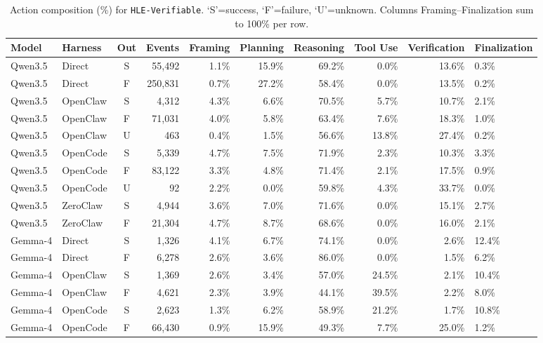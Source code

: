 \begin{table}[t]
\centering
\fontsize{7.5}{8.5}\selectfont
\renewcommand{\arraystretch}{1.12}
\setlength{\tabcolsep}{3.5pt}
\caption{Action composition (\%) for \texttt{HLE-Verifiable}. `S'=success, `F'=failure, `U'=unknown. Columns Framing--Finalization sum to 100\% per row.}
\label{tab:action-hle}
\vspace{-2pt}
\begin{tabular}{@{}llcrrrrrr@{}}
\toprule
Model & Harness & Out & Events & Framing & Planning & Reasoning & Tool Use & Verification & Finalization \\
\midrule
  Qwen3.5 & Direct & S & 55,492 & 1.1\% & 15.9\% & 69.2\% & 0.0\% & 13.6\% & 0.3\% \\
  Qwen3.5 & Direct & F & 250,831 & 0.7\% & 27.2\% & 58.4\% & 0.0\% & 13.5\% & 0.2\% \\
  Qwen3.5 & OpenClaw & S & 4,312 & 4.3\% & 6.6\% & 70.5\% & 5.7\% & 10.7\% & 2.1\% \\
  Qwen3.5 & OpenClaw & F & 71,031 & 4.0\% & 5.8\% & 63.4\% & 7.6\% & 18.3\% & 1.0\% \\
  Qwen3.5 & OpenClaw & U & 463 & 0.4\% & 1.5\% & 56.6\% & 13.8\% & 27.4\% & 0.2\% \\
  Qwen3.5 & OpenCode & S & 5,339 & 4.7\% & 7.5\% & 71.9\% & 2.3\% & 10.3\% & 3.3\% \\
  Qwen3.5 & OpenCode & F & 83,122 & 3.3\% & 4.8\% & 71.4\% & 2.1\% & 17.5\% & 0.9\% \\
  Qwen3.5 & OpenCode & U & 92 & 2.2\% & 0.0\% & 59.8\% & 4.3\% & 33.7\% & 0.0\% \\
  Qwen3.5 & ZeroClaw & S & 4,944 & 3.6\% & 7.0\% & 71.6\% & 0.0\% & 15.1\% & 2.7\% \\
  Qwen3.5 & ZeroClaw & F & 21,304 & 4.7\% & 8.7\% & 68.6\% & 0.0\% & 16.0\% & 2.1\% \\
\midrule
  Gemma-4 & Direct & S & 1,326 & 4.1\% & 6.7\% & 74.1\% & 0.0\% & 2.6\% & 12.4\% \\
  Gemma-4 & Direct & F & 6,278 & 2.6\% & 3.6\% & 86.0\% & 0.0\% & 1.5\% & 6.2\% \\
  Gemma-4 & OpenClaw & S & 1,369 & 2.6\% & 3.4\% & 57.0\% & 24.5\% & 2.1\% & 10.4\% \\
  Gemma-4 & OpenClaw & F & 4,621 & 2.3\% & 3.9\% & 44.1\% & 39.5\% & 2.2\% & 8.0\% \\
  Gemma-4 & OpenCode & S & 2,623 & 1.3\% & 6.2\% & 58.9\% & 21.2\% & 1.7\% & 10.8\% \\
  Gemma-4 & OpenCode & F & 66,430 & 0.9\% & 15.9\% & 49.3\% & 7.7\% & 25.0\% & 1.2\% \\

\end{tabular}
\end{table}
